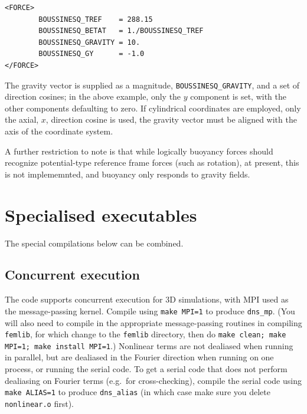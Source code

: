 \documentclass[11pt]{report}
\newcommand{\eg}{e.g.\ } \newcommand{\CC}{\mathrm{c.c.}}
\begin{document}
\begin{verbatim}
<FORCE>
        BOUSSINESQ_TREF    = 288.15
        BOUSSINESQ_BETAT   = 1./BOUSSINESQ_TREF
        BOUSSINESQ_GRAVITY = 10.
        BOUSSINESQ_GY      = -1.0
</FORCE>
\end{verbatim}

The gravity vector is supplied as a magnitude,
\verb|BOUSSINESQ_GRAVITY|, and a set of direction cosines; in the
above example, only the $y$ component is set, with the other
components defaulting to zero.  If cylindrical coordinates are
employed, only the axial, $x$, direction cosine is used, \ie the
gravity vector must be aligned with the axis of the coordinate system.

A further restriction to note is that while logically buoyancy forces
should recognize potential-type reference frame forces (such as
rotation), at present, this is not implememnted, and buoyancy only
responds to gravity fields.

\chapter{Specialised executables}

The special compilations below can be combined.

\section{Concurrent execution}
\label{sec.parallel}

The code supports concurrent execution for 3D simulations, with MPI
used as the message-passing kernel. Compile using \verb+make MPI=1+ to
produce \verb+dns_mp+. (You will also need to compile in the
appropriate message-passing routines in compiling \verb+femlib+, for
which change to the \verb+femlib+ directory, then do
\verb+make clean; make MPI=1; make install MPI=1+.)  Nonlinear terms
are not dealiased when running in parallel, but are dealiased in the
Fourier direction when running on one process, or running the serial
code. To get a serial code that does not perform dealiasing on Fourier
terms (\eg for cross-checking), compile the serial code using
\verb+make ALIAS=1+ to produce \verb+dns_alias+ (in which case make
sure you delete \verb+nonlinear.o+ first).

\end{document}
